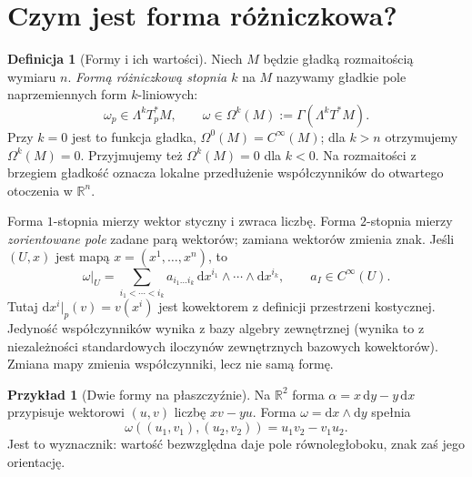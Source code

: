 \documentclass[11pt,a4paper,oneside]{report}
\newcommand{\R}{\mathbb{R}}
\newcommand{\dd}{\mathrm d}
\theoremstyle{plain}
\theoremstyle{definition}
\newtheorem{definicja}[twierdzenie]{Definicja}
\newtheorem{przyklad}[twierdzenie]{Przykład}
\theoremstyle{remark}
\begin{document}
\section{Czym jest forma różniczkowa?}
\label{sec:formy-definicje}

\begin{definicja}[Formy i ich wartości]
\label{def:forma-rozniczkowa}
Niech $M$ będzie gładką rozmaitością wymiaru $n$.
\emph{Formą różniczkową stopnia $k$} na $M$ nazywamy
gładkie pole naprzemiennych form $k$-liniowych:
\[
 \omega_p\in\Lambda^k T_p^*M,
 \qquad \omega\in\Omega^k(M)
 :=\Gamma(\Lambda^k T^*M).
\]
Przy $k=0$ jest to funkcja gładka,
$\Omega^0(M)=C^\infty(M)$; dla $k>n$ otrzymujemy
$\Omega^k(M)=0$. Przyjmujemy też $\Omega^k(M)=0$ dla $k<0$.
Na rozmaitości z brzegiem gładkość
oznacza lokalne przedłużenie współczynników do
otwartego otoczenia w $\R^n$.
\end{definicja}

Forma $1$-stopnia mierzy wektor styczny i zwraca liczbę.
Forma $2$-stopnia mierzy \emph{zorientowane pole} zadane
parą wektorów; zamiana wektorów zmienia znak.
Jeśli $(U,x)$ jest mapą $x=(x^1,\ldots,x^n)$, to
\begin{equation}\label{eq:forma-lokalna}
 \omega|_U=\sum_{i_1<\cdots<i_k}
 a_{i_1\ldots i_k}\,\dd x^{i_1}\wedge\cdots\wedge\dd x^{i_k},
 \qquad a_I\in C^\infty(U).
\end{equation}
Tutaj $\dd x^i|_p(v)=v(x^i)$ jest kowektorem z definicji przestrzeni kostycznej. Jedyność współczynników
wynika z bazy algebry zewnętrznej
(wynika to z niezależności standardowych iloczynów zewnętrznych bazowych kowektorów). Zmiana mapy zmienia
współczynniki, lecz nie samą formę.

\begin{przyklad}[Dwie formy na płaszczyźnie]
Na $\R^2$ forma $\alpha=x\,\dd y-y\,\dd x$
przypisuje wektorowi $(u,v)$ liczbę $xv-yu$.
Forma $\omega=\dd x\wedge\dd y$ spełnia
\[
 \omega((u_1,v_1),(u_2,v_2))
 =u_1v_2-v_1u_2.
\]
Jest to wyznacznik: wartość bezwzględna daje pole
równoległoboku, znak zaś jego orientację.
\end{przyklad}
\end{document}
